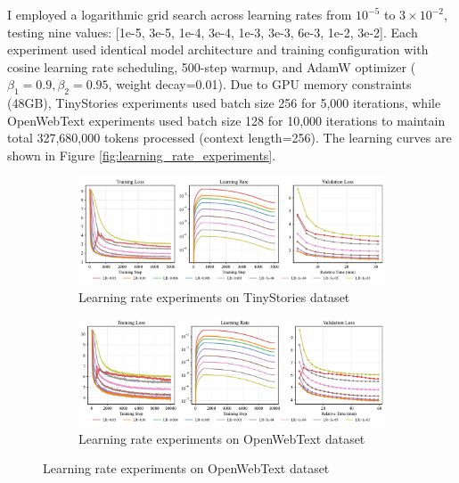 \begin{answer}


I employed a logarithmic grid search across learning rates from $10^{-5}$ to $3 \times 10^{-2}$, testing nine values: [1e-5, 3e-5, 1e-4, 3e-4, 1e-3, 3e-3, 6e-3, 1e-2, 3e-2]. Each experiment used identical model architecture and training configuration with cosine learning rate scheduling, 500-step warmup, and AdamW optimizer ($\beta_1=0.9, \beta_2=0.95$, weight decay=0.01). Due to GPU memory constraints (48GB), TinyStories experiments used batch size 256 for 5,000 iterations, while OpenWebText experiments used batch size 128 for 10,000 iterations to maintain total 327,680,000 tokens processed (context length=256). The learning curves are shown in Figure \ref{fig:learning_rate_experiments}.

\begin{figure}[h]
    \centering
    \begin{subfigure}[t]{\textwidth}
        \centering
        \includegraphics[width=\textwidth]{images/ts_learning_rate_experiments.pdf}
        \vspace{-20pt} %
        \caption{Learning rate experiments on TinyStories dataset}
        \label{fig:ts_learning_rate_experiments}
    \end{subfigure}
        
    \begin{subfigure}[t]{\textwidth}
        \centering
        \includegraphics[width=\textwidth]{images/owt_learning_rate_experiments.pdf}
        \vspace{-20pt} %
        \caption{Learning rate experiments on OpenWebText dataset}
        \label{fig:owt_learning_rate_experiments}
    \end{subfigure}
    

\end{figure}
\end{answer}
